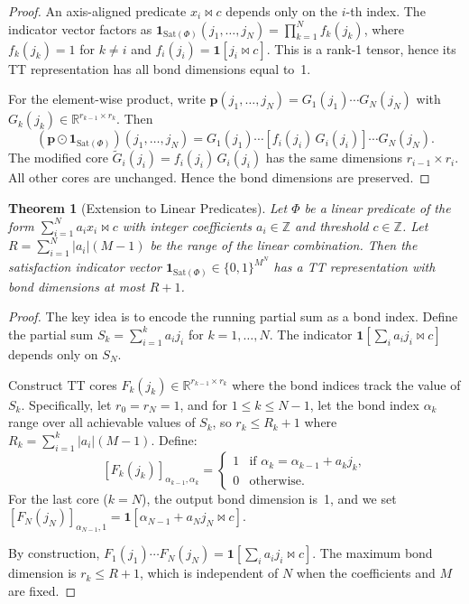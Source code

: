 \documentclass[11pt]{article}
\newtheorem{theorem}{Theorem}
\newcommand{\R}{\mathbb{R}}
\newcommand{\Sat}{\mathrm{Sat}}
\begin{document}
\begin{proof}
An axis-aligned predicate $x_i \bowtie c$ depends only on the
$i$-th index.
The indicator vector factors as
$\mathbf{1}_{\Sat(\Phi)}(j_1,\ldots,j_N) = \prod_{k=1}^{N} f_k(j_k)$,
where $f_k(j_k) = 1$ for $k \neq i$ and
$f_i(j_i) = \mathbf{1}[j_i \bowtie c]$.
This is a rank-1 tensor, hence its TT representation has all
bond dimensions equal to~1.

For the element-wise product, write
$\mathbf{p}(j_1,\ldots,j_N) = G_1(j_1)\cdots G_N(j_N)$
with $G_k(j_k) \in \R^{r_{k-1}\times r_k}$.
Then
\[
  (\mathbf{p} \odot \mathbf{1}_{\Sat(\Phi)})(j_1,\ldots,j_N)
  = G_1(j_1)\cdots [f_i(j_i)\,G_i(j_i)]\cdots G_N(j_N).
\]
The modified core $\tilde{G}_i(j_i) = f_i(j_i)\,G_i(j_i)$ has
the same dimensions $r_{i-1}\times r_i$.
All other cores are unchanged.
Hence the bond dimensions are preserved.
\end{proof}

\begin{theorem}[Extension to Linear Predicates]\label{thm:linear-predicates}
Let $\Phi$ be a linear predicate of the form
$\sum_{i=1}^{N} a_i x_i \bowtie c$ with integer coefficients
$a_i \in \mathbb{Z}$ and threshold $c \in \mathbb{Z}$.
Let $R = \sum_{i=1}^{N} |a_i|(M-1)$ be the range of the linear
combination.
Then the satisfaction indicator vector
$\mathbf{1}_{\Sat(\Phi)} \in \{0,1\}^{M^N}$
has a TT representation with bond dimensions at most $R+1$.
\end{theorem}

\begin{proof}
The key idea is to encode the running partial sum as a bond index.
Define the partial sum $S_k = \sum_{i=1}^{k} a_i j_i$ for
$k = 1, \ldots, N$.
The indicator $\mathbf{1}[\sum_i a_i j_i \bowtie c]$ depends only
on $S_N$.

Construct TT cores $F_k(j_k) \in \R^{r_{k-1} \times r_k}$ where
the bond indices track the value of $S_k$.
Specifically, let $r_0 = r_N = 1$, and for $1 \leq k \leq N-1$,
let the bond index $\alpha_k$ range over all achievable values of
$S_k$, so $r_k \leq R_k + 1$ where
$R_k = \sum_{i=1}^{k} |a_i|(M-1)$.
Define:
\[
  [F_k(j_k)]_{\alpha_{k-1}, \alpha_k} =
  \begin{cases}
    1 & \text{if } \alpha_k = \alpha_{k-1} + a_k j_k, \\
    0 & \text{otherwise.}
  \end{cases}
\]
For the last core ($k=N$), the output bond dimension is~1, and we set
$[F_N(j_N)]_{\alpha_{N-1}, 1} = \mathbf{1}[\alpha_{N-1} + a_N j_N \bowtie c]$.

By construction, $F_1(j_1) \cdots F_N(j_N) = \mathbf{1}[\sum_i a_i j_i \bowtie c]$.
The maximum bond dimension is $r_k \leq R + 1$, which is independent
of $N$ when the coefficients and $M$ are fixed.
\end{proof}
\end{document}
